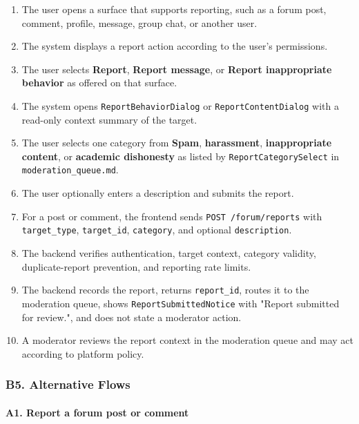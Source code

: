 \documentclass[12pt]{article}
\begin{document}
\begin{enumerate}
\item The user opens a surface that supports reporting, such as a forum post, comment, profile, message, group chat, or another user.
\item The system displays a report action according to the user's permissions.
\item The user selects \textbf{Report}, \textbf{Report message}, or \textbf{Report inappropriate behavior} as offered on that surface.
\item The system opens \texttt{ReportBehaviorDialog} or \texttt{ReportContentDialog} with a read-only context summary of the target.
\item The user selects one category from \textbf{Spam}, \textbf{harassment}, \textbf{inappropriate content}, or \textbf{academic dishonesty} as listed by \texttt{ReportCategorySelect} in \texttt{moderation\_queue.md}.
\item The user optionally enters a description and submits the report.
\item For a post or comment, the frontend sends \texttt{POST /forum/reports} with \texttt{target\_type}, \texttt{target\_id}, \texttt{category}, and optional \texttt{description}.
\item The backend verifies authentication, target context, category validity, duplicate-report prevention, and reporting rate limits.
\item The backend records the report, returns \texttt{report\_id}, routes it to the moderation queue, shows \texttt{ReportSubmittedNotice} with "Report submitted for review.", and does not state a moderator action.
\item A moderator reviews the report context in the moderation queue and may act according to platform policy.
\end{enumerate}
\par\medskip

\hypertarget{sec:b5-alternative-flows}{}
\subsubsection*{B5. Alternative Flows}
\par\medskip

\hypertarget{sec:a1-report-a-forum-post-or-comment}{}
\paragraph*{A1. Report a forum post or comment}
\par\medskip
\end{document}
